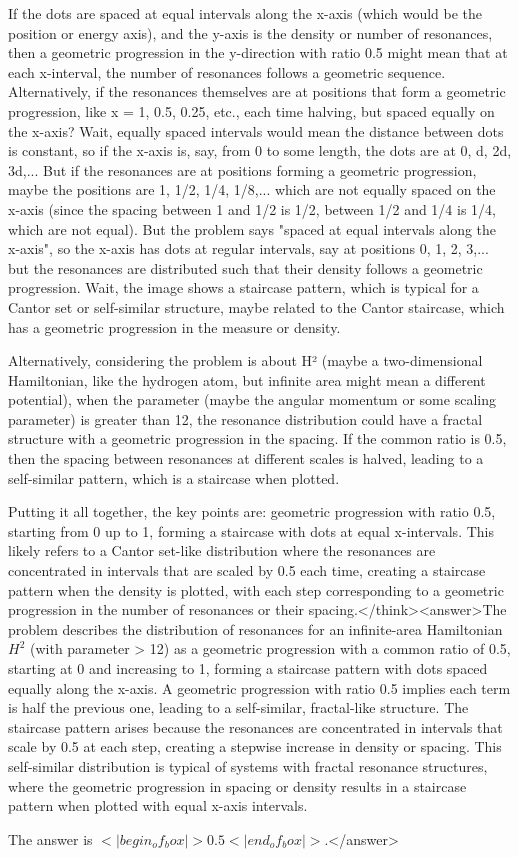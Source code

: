 If the dots are spaced at equal intervals along the x-axis (which would be the position or energy axis), and the y-axis is the density or number of resonances, then a geometric progression in the y-direction with ratio 0.5 might mean that at each x-interval, the number of resonances follows a geometric sequence. Alternatively, if the resonances themselves are at positions that form a geometric progression, like x = 1, 0.5, 0.25, etc., each time halving, but spaced equally on the x-axis? Wait, equally spaced intervals would mean the distance between dots is constant, so if the x-axis is, say, from 0 to some length, the dots are at 0, d, 2d, 3d,... But if the resonances are at positions forming a geometric progression, maybe the positions are 1, 1/2, 1/4, 1/8,... which are not equally spaced on the x-axis (since the spacing between 1 and 1/2 is 1/2, between 1/2 and 1/4 is 1/4, which are not equal). But the problem says "spaced at equal intervals along the x-axis", so the x-axis has dots at regular intervals, say at positions 0, 1, 2, 3,... but the resonances are distributed such that their density follows a geometric progression. Wait, the image shows a staircase pattern, which is typical for a Cantor set or self-similar structure, maybe related to the Cantor staircase, which has a geometric progression in the measure or density.

Alternatively, considering the problem is about H² (maybe a two-dimensional Hamiltonian, like the hydrogen atom, but infinite area might mean a different potential), when the parameter (maybe the angular momentum or some scaling parameter) is greater than 12, the resonance distribution could have a fractal structure with a geometric progression in the spacing. If the common ratio is 0.5, then the spacing between resonances at different scales is halved, leading to a self-similar pattern, which is a staircase when plotted.

Putting it all together, the key points are: geometric progression with ratio 0.5, starting from 0 up to 1, forming a staircase with dots at equal x-intervals. This likely refers to a Cantor set-like distribution where the resonances are concentrated in intervals that are scaled by 0.5 each time, creating a staircase pattern when the density is plotted, with each step corresponding to a geometric progression in the number of resonances or their spacing.</think><answer>The problem describes the distribution of resonances for an infinite-area Hamiltonian \( H^2 \) (with parameter > 12) as a geometric progression with a common ratio of 0.5, starting at 0 and increasing to 1, forming a staircase pattern with dots spaced equally along the x-axis. A geometric progression with ratio 0.5 implies each term is half the previous one, leading to a self-similar, fractal-like structure. The staircase pattern arises because the resonances are concentrated in intervals that scale by 0.5 at each step, creating a stepwise increase in density or spacing. This self-similar distribution is typical of systems with fractal resonance structures, where the geometric progression in spacing or density results in a staircase pattern when plotted with equal x-axis intervals.

The answer is \(<|begin_of_box|>0.5<|end_of_box|>\).</answer>